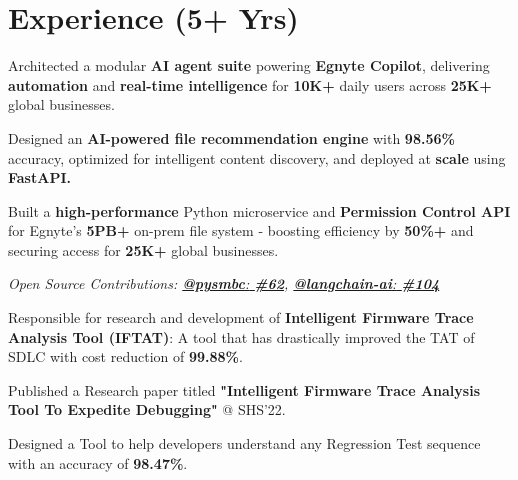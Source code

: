 \documentclass[]{deedy-resume-openfont}
\begin{document}
\begin{minipage}[t]{0.61\textwidth} 


\section{Experience (5+ Yrs)}
\vspace{\topsep} %
\begin{tightemize}
\item Architected a modular \textbf{AI agent suite} powering \textbf{Egnyte Copilot}, delivering \textbf{automation} and \textbf{real-time intelligence} for \textbf{10K+} daily users across \textbf{25K+} global businesses.
\item Designed an \textbf{AI-powered file recommendation engine} with \textbf{98.56\%} accuracy, optimized for intelligent content discovery, and deployed at \textbf{scale} using \textbf{FastAPI.}
\item Built a \textbf{high-performance} Python microservice and \textbf{Permission Control API} for Egnyte’s \textbf{5PB+} on-prem file system - boosting efficiency by \textbf{50\%+} and securing access for \textbf{25K+} global businesses.
\item \footnotesize \textit{Open Source Contributions: \href{https://pypi.org/project/pysmbc/}{\textbf{@pysmbc}:}\href{https://github.com/hamano/pysmbc/pull/62}{\textbf{ \#62}}, \href{https://pypi.org/project/langchain-community/}{\textbf{@langchain-ai}:}\href{https://github.com/langchain-ai/langchain-community/pull/104}{\textbf{ \#104}}}
\end{tightemize}
\sectionsep

\begin{tightemize}
\item Responsible for research and development of \textbf{Intelligent Firmware Trace Analysis Tool (IFTAT)}: A tool that has drastically improved the TAT of SDLC with cost reduction of \textbf{99.88\%}.
\item Published a Research paper titled \textbf{"Intelligent Firmware Trace Analysis Tool To Expedite Debugging"} @ SHS'22.
\item Designed a Tool to help developers understand any Regression Test sequence with an accuracy of \textbf{98.47\%}.
\end{tightemize}


\end{minipage}
\end{document}
